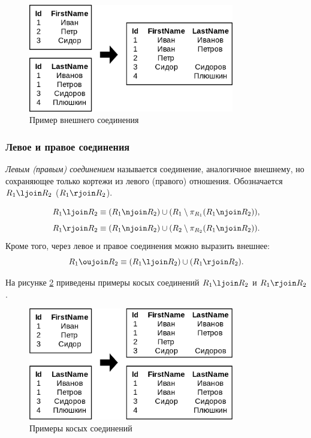 \begin{figure}[H]
	\centering
	\includegraphics[width=0.8\textwidth]{../assets/kgeorgiy/relalgebra/Join_Outer_2.svg.png}
	\caption{Пример внешнего соединения}
	\label{outer-join-ex}
\end{figure}

\subsubsection{Левое и правое соединения}

\begin{definition}
	\textit{Левым (правым) соединением} называется соединение, аналогичное внешнему, но сохраняющее
	только кортежи из левого (правого) отношения. Обозначается $R_1 \ljoin R_2$
	($R_1 \rjoin R_2$).
\end{definition}

\begin{remark}
	\[
		R_1 \ljoin R_2 \equiv (R_1 \njoin R_2) \cup (R_1 \setminus \pi_{R_1}(R_1 \njoin R_2)),
	\]
	\[
		R_1 \rjoin R_2 \equiv (R_1 \njoin R_2) \cup (R_2 \setminus \pi_{R_2}(R_1 \njoin R_2)).
	\]
	Кроме того, через левое и правое соединения можно выразить внешнее: \[
		R_1 \oujoin R_2 \equiv (R_1 \ljoin R_2) \cup (R_1 \rjoin R_2).
	\]
\end{remark}

На рисунке \ref{lr-join-ex} приведены примеры косых соединений $R_1 \ljoin R_2$ и
$R_1 \rjoin R_2$.

\begin{figure}[H]
	\centering
	\includegraphics[width=0.8\textwidth]{../assets/kgeorgiy/relalgebra/Join_LeftRight_2.svg.png}
	\caption{Примеры косых соединений}
	\label{lr-join-ex}
\end{figure}


